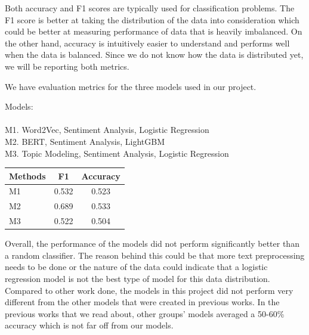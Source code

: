 \documentclass[conference]{IEEEtran}
\begin{document}
Both accuracy and F1 scores are typically used for classification problems. The F1 score is better at taking the distribution of the data into consideration which could be better at measuring performance of data that is heavily imbalanced. On the other hand, accuracy is intuitively easier to understand and performs well when the data is balanced. Since we do not know how the data is distributed yet, we will be reporting both metrics.

We have evaluation metrics for the three models used in our project.

Models: \\ \\
M1. Word2Vec, Sentiment Analysis, Logistic Regression \\
M2. BERT, Sentiment Analysis, LightGBM \\
M3. Topic Modeling, Sentiment Analysis, Logistic Regression \\

\begin{table}[htp]
    \begin{center}
        \begin{tabular}{|l||c|c|} \hline\hline
            Methods                                               & F1         & Accuracy  \\ \hline
            M1                    & 0.532        & 0.523   \\
            M2 & 0.689       & 0.533   \\
            M3                  & 0.522 & 0.504   \\
            \hline\hline
        \end{tabular}
    \end{center}
\end{table}

Overall, the performance of the models did not perform significantly better than a random classifier. The reason behind this could be that more text preprocessing needs to be done or the nature of the data could indicate that a logistic regression model is not the best type of model for this data distribution. Compared to other work done, the models in this project did not perform very different from the other models that were created in previous works. In the previous works that we read about, other groups' models averaged a 50-60\% accuracy which is not far off from our models. 
\end{document}

